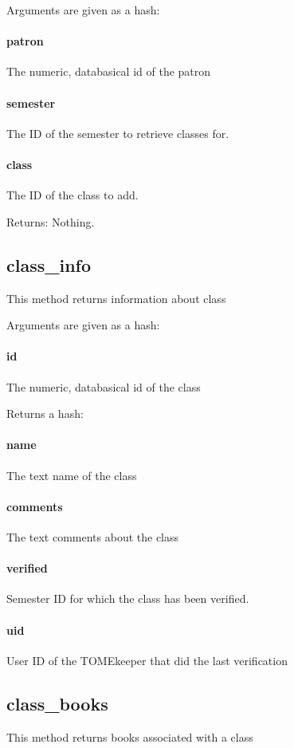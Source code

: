 \documentclass[12pt,titlepage]{article}
\begin{document}
Arguments are given as a hash:
\paragraph{patron}
The numeric, databasical id of the patron 

\paragraph{semester}
The ID of the semester to retrieve classes for. 

\paragraph{class}
The ID of the class to add. 

Returns: Nothing.

\subsection{class_info}
This method returns information about class

Arguments are given as a hash:
\paragraph{id}
The numeric, databasical id of the class 

Returns a hash:
\paragraph{name}
The text name of the class 

\paragraph{comments}
The text comments about the class 

\paragraph{verified}
Semester ID for which the class has been verified. 

\paragraph{uid}
User ID of the TOMEkeeper that did the last verification

\subsection{class_books}
This method returns books associated with a class
\end{document}
